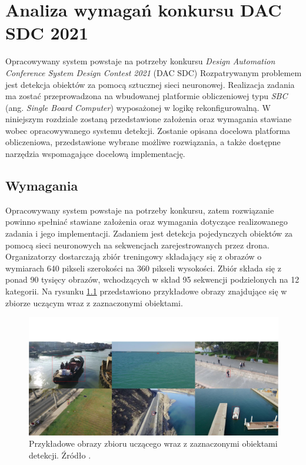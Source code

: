 \chapter{Analiza wymagań konkursu DAC SDC 2021}
\label{cha:Analiza probemu}

Opracowywany system powstaje na potrzeby konkursu \emph{Design Automation Conference System Design Contest 2021} (DAC SDC)
Rozpatrywanym problemem jest detekcja obiektów za pomocą sztucznej sieci neuronowej.
Realizacja zadania ma zostać przeprowadzona na wbudowanej platformie obliczeniowej typu \emph{SBC} (ang. \emph{Single Board Computer}) wyposażonej w logikę rekonfigurowalną.
W niniejszym rozdziale zostaną przedstawione założenia oraz wymagania stawiane wobec opracowywanego systemu detekcji.
Zostanie opisana docelowa platforma obliczeniowa, przedstawione wybrane możliwe rozwiązania, 
a także dostępne narzędzia wspomagające docelową implementację.


\section{Wymagania}
Opracowywany system powstaje na potrzeby konkursu, zatem rozwiązanie powinno spełniać stawiane założenia oraz wymagania dotyczące realizowanego zadania i jego implementacji.
Zadaniem jest detekcja pojedynczych obiektów za pomocą sieci neuronowych na sekwencjach zarejestrowanych przez drona.
Organizatorzy dostarczają zbiór treningowy składający się z obrazów o wymiarach 640 pikseli szerokości na 360 pikseli wysokości. Zbiór składa się z ponad 90 tysięcy obrazów, wchodzących w skład 95 sekwencji podzielonych na 12 kategorii. Na rysunku \ref{fig:sample_images} przedstawiono przykładowe obrazy znajdujące się w zbiorze uczącym wraz z zaznaczonymi obiektami.
\begin{figure}
    \centering
    \includegraphics[width=\linewidth]{images/sample_images.png}
    \caption{Przykładowe obrazy zbioru uczącego wraz z zaznaczonymi obiektami detekcji. Źródło \cite{dac_sdc_2021}.}
    \label{fig:sample_images}
\end{figure}

